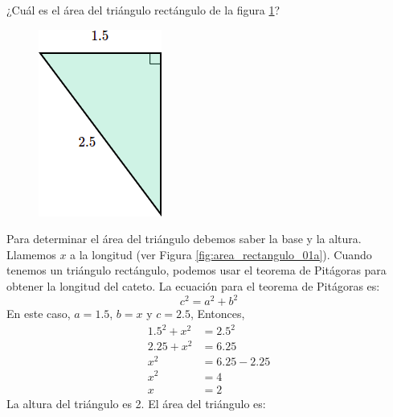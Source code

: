 ¿Cuál es el área del triángulo rectángulo de la figura \ref{fig:area_rectangulo_01}?

\begin{figure}[H]
    \begin{center}
        \includegraphics[width=0.15\linewidth]{../images/area_rectangulo_01.png}
    \end{center}
    \caption{}
    \label{fig:area_rectangulo_01}
\end{figure}
\begin{solutionbox}{14cm}

    \begin{minipage}{0.6\textwidth}
        Para determinar el área del triángulo debemos saber la base y la altura. Llamemos $x$ a la longitud (ver Figura \ref{fig:area_rectangulo_01a}).
        Cuando tenemos un triángulo rectángulo, podemos usar el teorema de Pitágoras para obtener la longitud del cateto.
        La ecuación para el teorema de Pitágoras es:
        \[c^2=a^2+b^2\]
        En este caso, $a=1.5$, $b=x$ y $c=2.5$, Entonces,
        \begin{align*}
            1.5^2+x^2 & =2.5^2     \\
            2.25+x^2  & =6.25      \\
            x^2       & =6.25-2.25 \\
            x^2       & =4         \\
            x         & =2
        \end{align*}
        La altura del triángulo es 2. El área del triángulo es:


\end{minipage}
\end{solutionbox}
